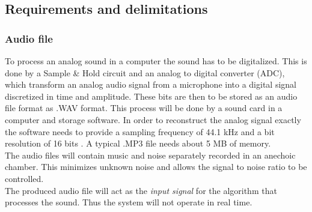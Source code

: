 \subsection{Requirements and delimitations}
\subsubsection{Audio file}
To process an analog sound in a computer the sound has to be digitalized. This is done by a Sample \& Hold circuit and an analog to digital converter (ADC), which transform an analog audio signal from a microphone into a digital signal discretized in time and amplitude. These bits are then to be stored as an audio file format as .WAV format. This process will be done by a sound card in a computer and storage software. In order to reconstruct the analog signal exactly the software needs to provide a sampling frequency of 44.1 kHz and a bit resolution of 16 bits \cite{Mic}. A typical .MP3 file needs about 5 MB of memory. \\
The audio files will contain music and noise separately recorded in an anechoic chamber. This minimizes unknown noise and allows the signal to noise ratio to be controlled. \\      
The produced audio file will act as the \textit{input signal} for the algorithm that processes the sound. Thus the system will not operate in real time. 

